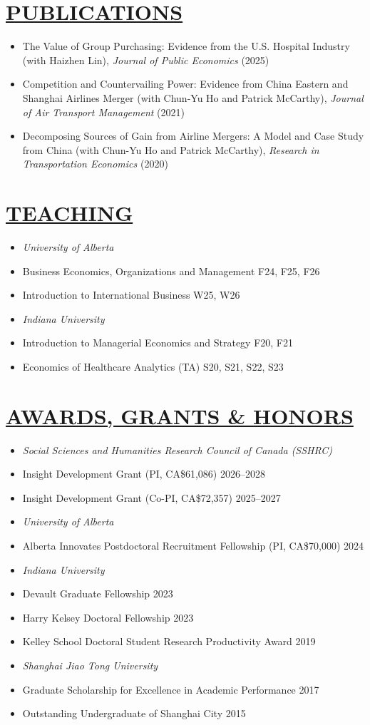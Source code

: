 \documentclass{res}
\newcommand{\sectionbodyspace}{\vspace{1.5em}}
\newenvironment{cvitems}{%
  \begin{itemize}[leftmargin=15pt,labelindent=-15pt,itemindent=-15pt,itemsep=0.2em]
}{%
  \end{itemize}
}
\newcommand{\cvitem}[1]{\item[] #1}
\newcommand{\cvgroup}[1]{\item[] \textit{#1}}
\newcommand{\cvdated}[2]{\item[] \hspace{13pt} #1 \hfill #2}
\begin{document}
\begin{resume}
\section{\large{\ul{PUBLICATIONS}}}
\sectionbodyspace
\begin{cvitems}
    \cvitem{The Value of Group Purchasing: Evidence from the U.S. Hospital Industry (with Haizhen Lin), \textit{Journal of Public Economics} (2025)}
    \cvitem{Competition and Countervailing Power: Evidence from China Eastern and Shanghai Airlines Merger (with Chun-Yu Ho and Patrick McCarthy), \textit{Journal of Air Transport Management} (2021)}
    \cvitem{Decomposing Sources of Gain from Airline Mergers: A Model and Case Study from China (with Chun-Yu Ho and Patrick McCarthy), \textit{Research in Transportation Economics} (2020)}
\end{cvitems}

\section{\large{\ul{TEACHING}}}
\sectionbodyspace
\begin{cvitems}
\cvgroup{University of Alberta}
    \cvdated{Business Economics, Organizations and Management}{F24, F25, F26}
    \cvdated{Introduction to International Business}{W25, W26}
\cvgroup{Indiana University}
    \cvdated{Introduction to Managerial Economics and Strategy}{F20, F21}
    \cvdated{Economics of Healthcare Analytics (TA)}{S20, S21, S22, S23}
\end{cvitems}

\section{\large{\ul{AWARDS, GRANTS \& HONORS}}}
\sectionbodyspace
\begin{cvitems}
  \cvgroup{Social Sciences and Humanities Research Council of Canada (SSHRC)}
      \cvdated{Insight Development Grant (PI, CA\$61,086)}{2026--2028}
      \cvdated{Insight Development Grant (Co-PI, CA\$72,357)}{2025--2027}
\cvgroup{University of Alberta}
    \cvdated{Alberta Innovates Postdoctoral Recruitment Fellowship (PI, CA\$70,000)}{2024}
\cvgroup{Indiana University}
    \cvdated{Devault Graduate Fellowship}{2023}
    \cvdated{Harry Kelsey Doctoral Fellowship}{2023}
    \cvdated{Kelley School Doctoral Student Research Productivity Award}{2019}
\cvgroup{Shanghai Jiao Tong University}
    \cvdated{Graduate Scholarship for Excellence in Academic Performance}{2017}
    \cvdated{Outstanding Undergraduate of Shanghai City}{2015}
\end{cvitems}


\end{resume}
\end{document}
